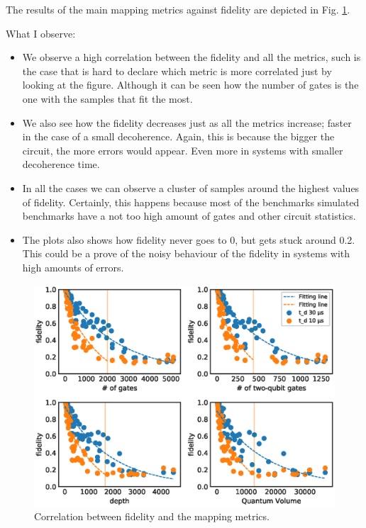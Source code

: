 The results of the main mapping metrics against fidelity are depicted in Fig. \ref{fig:f_metrics_correlation}.

What I observe:

\begin{itemize}
\item We observe a high correlation between the fidelity and all the metrics, such is the case that is hard to declare which metric is more correlated just by looking at the figure. Although it can be seen how the number of gates is the one with the samples that fit the most.
\item We also see how the fidelity decreases just as all the metrics increase; faster in the case of a small decoherence. Again, this is because the bigger the circuit, the more errors would appear. Even more in systems with smaller decoherence time.
\item In all the cases we can observe a cluster of samples around the highest values of fidelity. Certainly, this happens because most of the benchmarks simulated benchmarks have a not too high amount of gates and other circuit statistics.
\item The plots also shows how fidelity never goes to 0, but gets stuck around 0.2. This could be a prove of the noisy behaviour of the fidelity in systems with high amounts of errors.
\end{itemize}

\begin{figure}[htbp]
\centering
\includegraphics[width=\textwidth]{figures/f_metrics_correlation_poly.eps}
\caption{\label{fig:f_metrics_correlation}
Correlation between fidelity and the mapping metrics.}
\end{figure}

